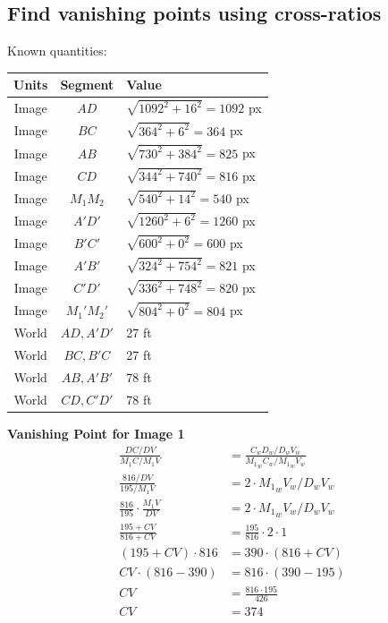 \documentclass[12pt, oneside]{article}
\begin{document}
\subsection{Find vanishing points using cross-ratios}

Known quantities:
\begin{table}[H]
\centering
\begin{tabular}{|c|c|l|}
\hline
\multicolumn{1}{|l|}{\textbf{Units}} & \textbf{Segment} & \textbf{Value}                \\ \hline
Image & $AD$      & $\sqrt{1092^2 + 16^2} = 1092$ px     \\ \hline
Image & $BC$      & $\sqrt{364^2 + 6^2} = 364$ px       \\ \hline
Image & $AB$      & $\sqrt{730^2 + 384^2} = 825$ px     \\ \hline
Image & $CD$      & $\sqrt{344^2 + 740^2} = 816$ px     \\ \hline
Image & $M_1 M_2$ & $\sqrt{540^2 + 14^2} = 540$ px     \\ \hline
Image & $A'D'$      & $\sqrt{1260^2 + 6^2} = 1260$ px     \\ \hline
Image & $B'C'$      & $\sqrt{600^2 + 0^2} = 600$ px       \\ \hline
Image & $A'B'$      & $\sqrt{324^2 + 754^2} = 821$ px     \\ \hline
Image & $C'D'$      & $\sqrt{336^2 + 748^2} = 820$ px     \\ \hline
Image & $M_1' M_2'$ & $\sqrt{804^2 + 0^2} = 804$ px     \\ \hline
World & $AD, A'D'$      & 27 ft     \\ \hline
World & $BC, B'C$       & 27 ft     \\ \hline
World & $AB, A'B'$      & 78 ft     \\ \hline
World & $CD, C'D'$      & 78 ft     \\ \hline
\end{tabular}
\end{table}

\textbf{Vanishing Point for Image 1}
\begin{align*}
  \frac{DC/DV}{{M_1}C/M_1V} &= \frac{C_wD_w/D_wV_w}{{M_1}_wC_w/{M_1}_wV_w} \\
  \frac{816/DV}{195/M_1V}                 &= 2 \cdot {M_1}_wV_w/D_wV_w \\
  \frac{816}{195}\cdot \frac{M_1V}{DV}    &= 2 \cdot {M_1}_wV_w/D_wV_w \\
  \frac{195 + CV}{816 + CV}   &= \frac{195}{816}\cdot 2 \cdot 1 \\
  (195 + CV) \cdot 816   &= 390 \cdot (816 + CV) \\
  CV \cdot (816 - 390)   &= 816 \cdot (390 - 195)\\
  CV  &= \frac{816 \cdot 195} {426}\\
  CV  &= 374\\
\end{align*}
\end{document}
